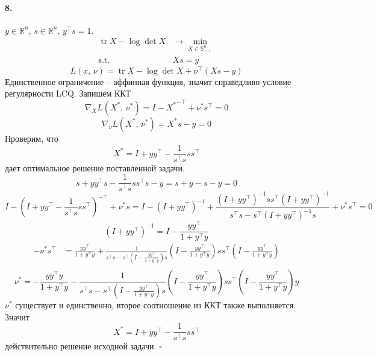 \documentclass{article}
\DeclareMathOperator{\tr}{tr}
\newcommand*{\QED}{\null\nobreak\hfill\ensuremath{\square}}
\newcommand*{\R}{\mathbb{R}}
\newcommand*{\st}{\text{s.t. }}
\newcommand*{\1}{\mathbf{1}}
\begin{document}
\paragraph{8.} $y \in \R^n,\, s \in \R^n,\, y^\top s = 1$.
\[ \begin{split}
    \tr X - \log\det X &\to \min\limits_{X \in \mathbb{S}_{++}^n} \\
    \st & Xs = y
\end{split} \]
\[ L(x,\, \nu) = \tr X - \log\det X + \nu^\top (Xs - y) \]
Единственное ограничение -- аффинная функция, значит справедливо условие регулярности LCQ. Запишем ККТ
\[ \nabla_X L(X^\ast,\, \nu^\ast) = I - {X^\ast}^{-\top} + \nu^\ast s^\top = 0 \]
\[ \nabla_\nu L(X^\ast,\, \nu^\ast) = X^\ast s - y = 0 \]
Проверим, что \[ X^\ast = I + yy^\top - \frac{1}{s^\top s} s s^\top \] дает оптимальное решение поставленной задачи.
\[ s + yy^\top s - \frac{1}{s^\top s} s s^\top s - y = s + y - s - y = 0 \]
\[ I - \left(I + y y^\top - \frac{1}{s^\top s} s s^{\top}\right)^{-\top} + \nu^\ast s = I - \left( I + yy^\top \right)^{-1} + \frac{\left( I + yy^\top \right)^{-1} s s^\top \left( I + yy^\top \right)^{-1}}{s^{\top} s - s^\top \left( I + yy^\top \right)^{-1} s} + \nu^\ast s^\top = 0 \]
\[ \left(I + yy^\top \right)^{-1} = I - \frac{yy^\top}{1 + y^\top y} \]
\[ \begin{split} 
    -\nu^\ast s^\top 
    &= \frac{yy^\top}{1 + y^\top y} + \frac{1}{s^{\top} s - s^\top \left( I - \frac{yy^\top}{1 + y^\top y} \right) s} \left( I - \frac{yy^\top}{1 + y^\top y} \right) s s^\top \left( I - \frac{yy^\top}{1 + y^\top y} \right) \\ 
\end{split} \]
\[ \nu^\ast = -\frac{yy^\top y}{1 + y^\top y} - \frac{1}{s^{\top} s - s^\top \left( I - \frac{yy^\top}{1 + y^\top y} \right) s} \left( I - \frac{yy^\top}{1 + y^\top y} \right) s s^\top \left( I - \frac{yy^\top}{1 + y^\top y} \right) y \]
$\nu^\ast$ существует и единственно, второе соотношение из ККТ также выполняется. Значит \[ X^\ast = I + yy^\top - \frac{1}{s^\top s} s s^\top \] действительно решение исходной задачи. \QED 
\end{document}
